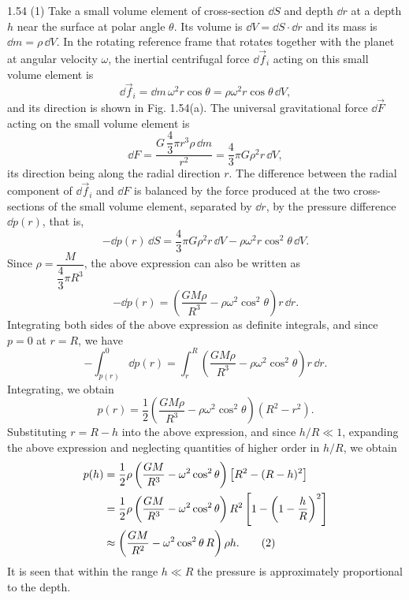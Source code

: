 \begin{solution}{1.54}
(1) Take a small volume element of cross-section $\dd S$ and depth $\dd r$ at a depth $h$ near the surface at polar angle $\theta$. Its volume is $\dd V=\dd S\cdot\dd r$ and its mass is $\dd m=\rho\,\dd V$. In the rotating reference frame that rotates together with the planet at angular velocity $\omega$, the inertial centrifugal force $\dd\vec{f}_i$ acting on this small volume element is
\[
\dd\vec{f}_i=\dd m\,\omega^2r\cos\theta=\rho\omega^2r\cos\theta\,\dd V,
\]
and its direction is shown in Fig. 1.54(a). The universal gravitational force $\dd\vec{F}$ acting on the small volume element is
\[
\dd F=\frac{G\,\dfrac{4}{3}\pi r^3\rho\,\dd m}{r^2}=\frac{4}{3}\pi G\rho^2r\,\dd V,
\]
its direction being along the radial direction $r$. The difference between the radial component of $\dd\vec{f}_i$ and $\dd F$ is balanced by the force produced at the two cross-sections of the small volume element, separated by $\dd r$, by the pressure difference $\dd p(r)$, that is,
\[
-\dd p(r)\,\dd S=\frac{4}{3}\pi G\rho^2r\,\dd V-\rho\omega^2r\cos^2\theta\,\dd V.
\]
Since $\rho=\dfrac{M}{\dfrac{4}{3}\pi R^3}$, the above expression can also be written as
\[
-\dd p(r)=\left(\frac{GM\rho}{R^3}-\rho\omega^2\cos^2\theta\right)r\,\dd r.
\]
Integrating both sides of the above expression as definite integrals, and since $p=0$ at $r=R$, we have
\[
-\int_{p(r)}^{0}\dd p(r)=\int_{r}^{R}\left(\frac{GM\rho}{R^3}-\rho\omega^2\cos^2\theta\right)r\,\dd r.
\]
Integrating, we obtain
\begin{equation}
p(r)=\frac{1}{2}\left(\frac{GM\rho}{R^3}-\rho\omega^2\cos^2\theta\right)\left(R^2-r^2\right). \tag{1}
\end{equation}
Substituting $r=R-h$ into the above expression, and since $h/R\ll1$, expanding the above expression and neglecting quantities of higher order in $h/R$, we obtain
\begin{align}
p(h)&=\frac{1}{2}\rho\left(\frac{GM}{R^3}-\omega^2\cos^2\theta\right)\left[R^2-(R-h)^2\right]\notag\\
&=\frac{1}{2}\rho\left(\frac{GM}{R^3}-\omega^2\cos^2\theta\right)R^2\left[1-\left(1-\frac{h}{R}\right)^2\right]\notag\\
&\approx\left(\frac{GM}{R^2}-\omega^2\cos^2\theta\,R\right)\rho h. \tag{2}
\end{align}
It is seen that within the range $h\ll R$ the pressure is approximately proportional to the depth.


\end{solution}
